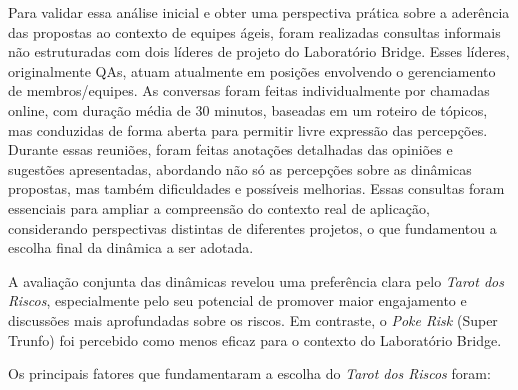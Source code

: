 \documentclass[
	12pt,
	openright,
	twoside,
	a4paper,
	english,
	brazil
	]{abntex2}
\begin{document}
Para validar essa análise inicial e obter uma perspectiva prática sobre a aderência das propostas ao contexto de equipes ágeis, foram realizadas consultas informais não estruturadas com dois líderes de projeto do Laboratório Bridge. Esses líderes, originalmente QAs, atuam atualmente em posições envolvendo o gerenciamento de membros/equipes. As conversas foram feitas individualmente por chamadas online, com duração média de 30 minutos, baseadas em um roteiro de tópicos, mas conduzidas de forma aberta para permitir livre expressão das percepções. Durante essas reuniões, foram feitas anotações detalhadas das opiniões e sugestões apresentadas, abordando não só as percepções sobre as dinâmicas propostas, mas também dificuldades e possíveis melhorias. Essas consultas foram essenciais para ampliar a compreensão do contexto real de aplicação, considerando perspectivas distintas de diferentes projetos, o que fundamentou a escolha final da dinâmica a ser adotada.

A avaliação conjunta das dinâmicas revelou uma preferência clara pelo \textit{Tarot dos Riscos}, especialmente pelo seu potencial de promover maior engajamento e discussões mais aprofundadas sobre os riscos. Em contraste, o \textit{Poke Risk} (Super Trunfo) foi percebido como menos eficaz para o contexto do Laboratório Bridge.

Os principais fatores que fundamentaram a escolha do \textit{Tarot dos Riscos} foram:
\end{document}
